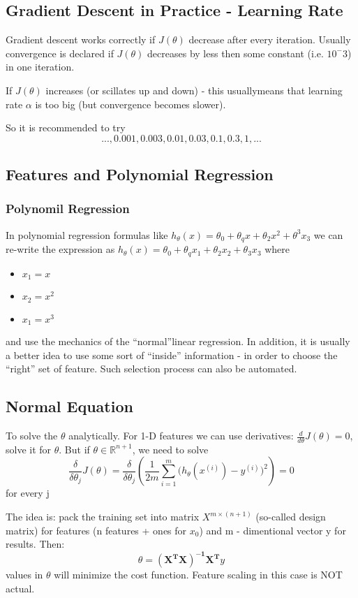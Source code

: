 \documentclass{scrartcl}
\begin{document}
\subsection {Gradient Descent in Practice - Learning Rate}
\label {4-4}
Gradient descent works correctly if $J(\theta)$ decrease after every
iteration. Usually convergence is declared if $J(\theta)$ decreases by
less then some constant (i.e. $10^-{3}$) in one iteration.

If $J(\theta)$ increases (or scillates up and down) - this
usuallymeans that learning rate $\alpha$ is too big (but convergence
becomes slower).

So it is recommended to try \[ ..., 0.001,0.003, 0.01, 0.03, 0.1, 0.3,
1, ...
\]
 
\subsection{Features and Polynomial Regression}
\label{4-5}
\subsubsection{Polynomil Regression}
In polynomial regression formulas like $h_\theta(x)=\theta_0 +
\theta_qx + \theta_2x^2 + \theta^3x_3$ we can re-write the expression
as $h_\theta(x) = \theta_0 + \theta_qx_1 + \theta_2x_2 + \theta_3x_3$
where \begin{itemize}
\item{$x_1=x$}
\item{$x_2=x^2$}
\item{$x_1=x^3$}
\end{itemize}
and use the mechanics of the ``normal''linear regression. In addition,
it is usually a better idea to use some sort of ``inside'' information
- in order to choose the ``right'' set of feature. Such selection
process can also be automated.

\subsection {Normal Equation}
\label{4-6}
To solve the $\theta$ analytically. For 1-D features we can use
derivatives: $\frac{d}{d\theta}J(\theta) = 0$, solve it for $\theta$.
But if $\theta \in \mathbb{R}^{n+1}$, we need to solve \[
\frac{\delta}{\delta \theta_j}J(\theta) = \frac{\delta}{\delta
  \theta_j} \left( \frac{1}{2m}
  \sum\limits_{i=1}^m\big(h_\theta(x^{(i)}) - y^{(i)}\big)^2\right) =
0
\] for every j

The idea is: pack the training set into matrix $X^{m \times (n + 1)}$
(so-called design matrix) for features (n features + ones for $x_0$)
and m - dimentional vector y for results. Then:
\[ \theta = \mathbf{\left( X^TX \right)^{-1}X^T}y \] values in
$\theta$ will minimize the cost function. Feature scaling in this case
is NOT actual.
\end{document}
